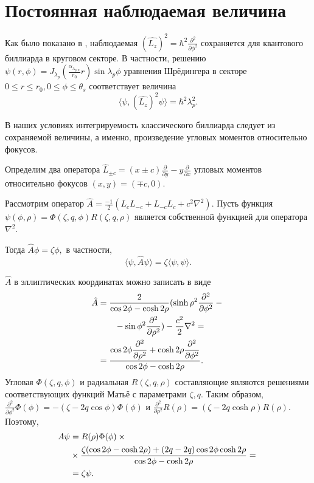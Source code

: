 \chapter{Постоянная наблюдаемая величина}\label{app:A}

Как было показано в  \cite{wref13}, наблюдаемая  $(\hat{L_z})^2=\hbar^2\frac{\partial^2}{\partial \phi^2}$ сохраняется для квантового биллиарда в круговом секторе. 
В частности, решению $\psi(r,\phi) = J_{\lambda_p}(\frac{\alpha_{\lambda_{p,n}}}{r_0}r) \sin \lambda_p \phi$ 
уравнения Шрёдингера в секторе $0\leq r \leq r_0, 0 \leq \phi \leq \theta_s$ соответствует величина $$\langle \psi, (\hat{L_z})^2\psi\rangle = \hbar^2 \lambda_p^2.$$

В наших условиях интегрируемость классического биллиарда следует из сохраняемой величины, а именно, произведение угловых моментов относительно фокусов.


Определим два оператора  $\hat L_{\pm c} = (x \pm c)\frac{\partial}{\partial y} - y\frac{\partial}{\partial x}$ угловых моментов относительно фокусов  $(x,y) = (\mp c, 0)$.


Рассмотрим оператор  $\hat A = \frac{-1}{2}(L_c L_{-c} + L_{-c} L_c + c^2 \nabla ^2)$. Пусть функция $\psi(\phi, \rho) = \Phi(\zeta, q, \phi) R(\zeta, q, \rho)$ является собственной функцией для оператора $\nabla^2$. %

Тогда
$\hat A \phi = \zeta \phi,$
в частности,
\begin{equation}
\langle  \psi, \hat A \psi\rangle = \zeta \langle\psi, \psi\rangle. \label{eq:cons}
\end{equation}


$\hat A$ в эллиптических координатах можно записать в виде 
\begin{align*}
\hat A & = \frac{2}{\cos 2\phi - \cosh 2\rho}(\sinh{\rho}^2 \dfrac{\partial^2}{\partial \phi^2}-{}\notag\\ 
&\qquad{}-\sin\phi^2\dfrac{\partial^2}{\partial \rho^2})  -\frac{c^2}{2} \nabla^2 =\notag\\
&= \frac{\cos 2\phi \dfrac{\partial^2}{\partial \rho^2} + \cosh 2\rho \dfrac{\partial^2}{\partial \phi^2}}{\cos 2 \phi - \cosh 2 \rho}.
\end{align*}
Угловая  $\Phi(\zeta, q, \phi)$ и радиальная   $R(\zeta, q, \rho)$ составляющие являются решениями соответствующих функций Матьё с параметрами  $\zeta, q$.
Таким образом,
$\frac{\partial^2}{\partial \phi ^2} \Phi(\phi) = -(\zeta-2q\cos\phi)\Phi(\phi)$ и $\frac{\partial^2}{\partial \rho ^2} R(\rho) = (\zeta-2q\cosh\rho)R(\rho)$. 
Поэтому,
\begin{align*}
A \psi &= R(\rho)\Phi(\phi)\times {}\notag\\
&{}\times\frac{\zeta(\cos 2\phi -\cosh2\rho) + (2q-2q)\cos2\phi\cosh2\rho}{\cos 2 \phi - \cosh 2 \rho} = {}\notag \\
&{}=\zeta \psi.
\end{align*}

